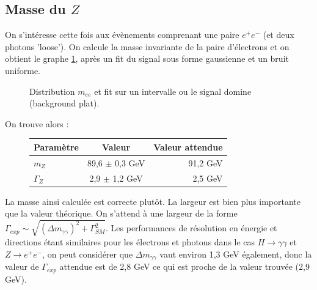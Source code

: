 \documentclass[11pt]{article} %
\begin{document}


\subsection{Masse du $Z$}

On s'intéresse cette fois aux évènements comprenant une paire $e^+e^-$ (et deux photons 'loose'). On calcule la masse invariante de la paire d'électrons et on obtient le graphe \ref{fig:distribution_mee}, après un fit du signal sous forme gaussienne et un bruit uniforme. 

\begin{figure}[H]
\centering
  \caption{Distribution $m_{ee}$ et fit sur un intervalle ou le signal domine (background plat).  }
\label{fig:distribution_mee}
 \resizebox{.9\linewidth}{!}{}
\end{figure}


On trouve alors :

\begin{figure}[H]
\centering
\begin{tabular}{|l|c|r|} 
   \hline
   Paramètre & Valeur & Valeur attendue \\
    \hline
   $m_Z$ & 89,6 $\pm$ 0,3 GeV & 91,2 GeV\\
  \hline
   $\Gamma_Z$ & 2,9 $\pm$ 1,2 GeV & 2,5 GeV \\
 \hline
\end{tabular}
\end{figure}

La masse ainsi calculée est correcte plutôt. La largeur est bien plus importante que la valeur théorique. On s'attend à une largeur de la forme $\Gamma_{exp} \sim \sqrt{(\Delta m_{\gamma \gamma})^2 + \Gamma_{SM}^2}$. Les performances de résolution en énergie et directions étant similaires pour les électrons et photons dans le cas $H \to \gamma \gamma$ et $Z\to e^+e^-$, on peut considérer que $\Delta m_{\gamma \gamma} $ vaut environ 1,3 GeV également, donc la valeur de $\Gamma_{exp}$ attendue est de 2,8 GeV ce qui est proche de la valeur trouvée (2,9 GeV).
\end{document}
